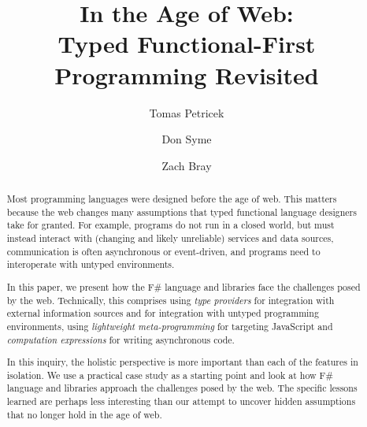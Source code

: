 \documentclass[submission,copyright,creativecommons]{eptcs}
\title{In the Age of Web:\\
  \textnormal{\LARGE Typed Functional-First Programming Revisited}}
\author{Tomas Petricek
\institute{University of Cambridge, UK}
\email{tomas@tomasp.net}
\and
Don Syme
\institute{Microsoft Research Cambridge, UK}
\email{don.syme@microsoft.com}
\and
Zach Bray
\institute{Type Inferred Ltd}
\email{zachbray@gmail.com}
}
\begin{document}
\maketitle


\begin{abstract}
Most programming languages were designed before the age of web.
This matters because the web changes many assumptions that typed functional language designers take
for granted. For example, programs do not run in a closed world, but must instead interact with
(changing and likely unreliable) services and data sources, communication is often asynchronous
or event-driven, and programs need to interoperate with untyped environments.

In this paper, we present how the F\# language and libraries face the challenges posed by the web.
Technically, this comprises using \emph{type providers} for integration with external information
sources and for integration with untyped programming environments, using \emph{lightweight
meta-programming} for targeting JavaScript and \emph{computation expressions} for writing
asynchronous code.

In this inquiry, the holistic perspective is more important than each of the features in isolation.
We use a practical case study as a starting point and look at how F\# language and libraries
approach the challenges posed by the web. The specific lessons learned are perhaps less interesting
than our attempt to uncover hidden assumptions that no longer hold in the age of web.
\end{abstract}



%
%
\end{document}
